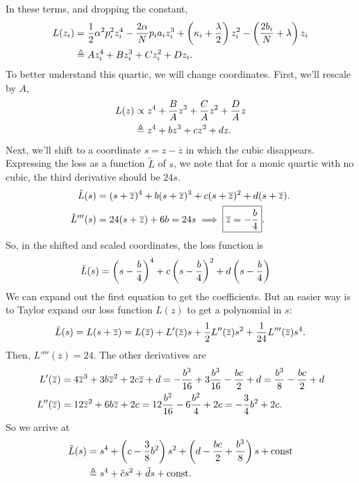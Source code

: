 \documentclass[10pt]{article}
\newcommand{\ol}[1]{\overline{#1}}
\newcommand{\la}{\lambda}
\newcommand{\ka}{\kappa}
\begin{document}
In these terms, and dropping the constant, \begin{align}
  \label{eq:Lzi}
  L(z_i) &= {1\over 2}\alpha^2 p_i^2 z_i^4
  - {2 \alpha \over N} p_i a_i z_i^3 
  + \left(\ka_i + {\la \over 2}\right)z_i^2
  - \left({2 b_i \over N}  + \la \right) z_i\\ &\triangleq A z_i^4 + B z_i^3 + C z_i^2 + D z_i.
\end{align}
To better understand this quartic, we will change coordinates. First, we'll rescale by $A$,
\begin{align*}
  L(z) &\propto z^4 + {B \over A} z^3 + {C \over A} z^2 + {D \over A} z\\
  &\triangleq z^4 + b z^3 + c z^2 + d z.
\end{align*}
Next, we'll shift to a coordinate $s = z - \ol{z}$ in which the cubic disappears. Expressing the loss as a function $\tilde L$ of $s$, we note that for a monic quartic with no cubic, the third derivative should be $24 s$. \begin{align*} \tilde L(s) &= (s + \ol{z})^4 + b (s + \ol{z})^3 + c (s + \ol{z})^2 + d (s + \ol{z}).\\
  \tilde L'''(s) &= 24 (s + \ol{z}) + 6 b = 24 s \implies \boxed{\ol{z} = -{b \over 4}}.
\end{align*}
So, in the shifted and scaled coordinates, the loss function is
\begin{align*}
  \nonumber
  \tilde L(s) &= \left(s - {b \over 4}\right)^4 + c\left(s - {b \over 4}\right)^2 + d \left(s - {b \over 4}\right)
  \end{align*}
We can expand out the first equation to get the coefficients. But an easier way is to Taylor expand our loss function $L(z)$ to get a polynomial in $s$:
$$ \tilde L(s) = L(s + \ol{z}) = L(\ol{z}) + L'(\ol{z}) s + {1 \over 2} L''(\ol{z}) s^2 + {1 \over 24} L'''(\ol{z}) s^4.$$
Then, $L''''(\ol{z}) = 24$. The other derivatives are \begin{align*}
  L'(\ol{z}) &= 4 \ol{z}^3 + 3b \ol{z}^2 + 2c \ol{z} + d = - {b^3 \over 16} + 3 {b^3 \over 16} - {bc \over 2} + d = {b^3 \over 8} - {bc \over 2} + d\\
  L''(\ol{z}) &= 12 \ol{z}^2 + 6 b \ol{z} + 2c = 12 {b^2 \over 16} - 6 {b^2 \over 4} + 2 c = -{3 \over 4}b^2 + 2 c.
\end{align*}
So we arrive at \begin{align} \nonumber \tilde L(s) &= s^4 + \left(c - {3 \over 8} b^2 \right) s^2 + \left(d - {b c \over 2} + {b^3 \over 8} \right) s + \text{const} \\ &\triangleq s^4 + \tilde c s^2 + \tilde d s + \text{const}. \end{align} 
\end{document}
